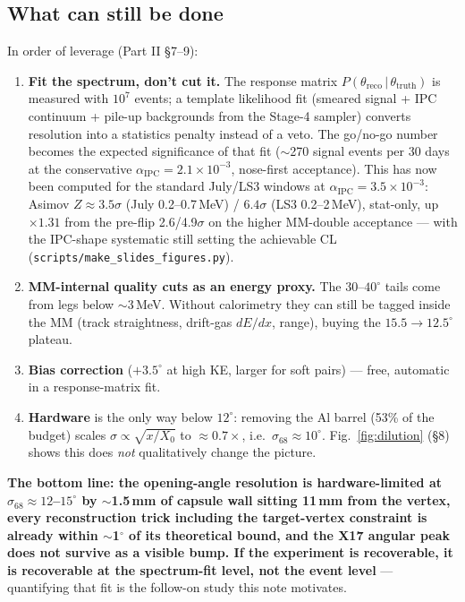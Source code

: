 \documentclass[11pt,a4paper]{article}
\newcommand{\sig}[1]{\sigma_{68}^{#1}}
\begin{document}
\subsection*{What can still be done}
In order of leverage (Part II \S7--9):
\begin{enumerate}
\item \textbf{Fit the spectrum, don't cut it.} The response matrix
  $P(\theta_{\mathrm{reco}}\,|\,\theta_{\mathrm{truth}})$ is measured with
  $10^{7}$ events; a template likelihood fit (smeared signal + IPC continuum
  + pile-up backgrounds from the Stage-4 sampler) converts resolution into a
  statistics penalty instead of a veto. The go/no-go number becomes the
  expected significance of that fit ($\sim$270 signal events per 30 days at
  the conservative $\alpha_{\mathrm{IPC}}=2.1\times10^{-3}$, nose-first
  acceptance). This has now been computed for the standard July/LS3 windows at
  $\alpha_{\mathrm{IPC}}=3.5\times10^{-3}$: Asimov $Z\approx3.5\sigma$ (July
  0.2--0.7\,MeV) / $6.4\sigma$ (LS3 0.2--2\,MeV), stat-only, up $\times1.31$
  from the pre-flip 2.6/4.9$\sigma$ on the higher MM-double acceptance --- with
  the IPC-shape systematic still setting the achievable CL
  (\texttt{scripts/make\_slides\_figures.py}).
\item \textbf{MM-internal quality cuts as an energy proxy.} The
  $30$--$40^{\circ}$ tails come from legs below $\sim$3\,MeV. Without
  calorimetry they can still be tagged inside the MM (track straightness,
  drift-gas $dE/dx$, range), buying the $15.5\to12.5^{\circ}$ plateau.
\item \textbf{Bias correction} ($+3.5^{\circ}$ at high KE, larger for soft
  pairs) --- free, automatic in a response-matrix fit.
\item \textbf{Hardware} is the only way below $12^{\circ}$: removing the Al
  barrel (53\% of the budget) scales $\sigma \propto \sqrt{x/X_0}$ to
  $\approx\!0.7\times$, i.e.\ $\sig{}\approx10^{\circ}$.
  Fig.~\ref{fig:dilution} (\S8) shows this does \emph{not} qualitatively
  change the picture.
\end{enumerate}

\noindent\textbf{The bottom line: the opening-angle resolution is
hardware-limited at $\sig{} \approx 12$--$15^{\circ}$ by $\sim$1.5\,mm of
capsule wall sitting 11\,mm from the vertex, every reconstruction trick
including the target-vertex constraint is already within $\sim$1$^{\circ}$ of
its theoretical bound, and the X17 angular peak does not survive as a visible
bump. If the experiment is recoverable, it is recoverable at the
spectrum-fit level, not the event level} --- quantifying that fit is the
follow-on study this note motivates.
\end{document}
